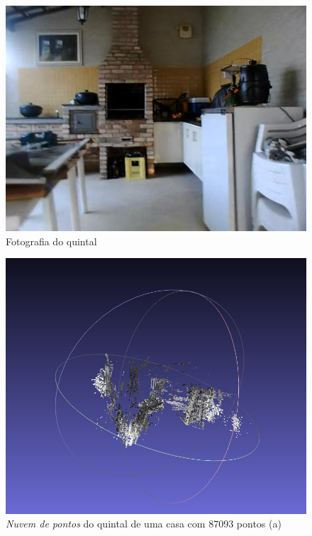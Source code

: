 \begin{figure}[H]
	\centering
		\includegraphics[width= \textwidth]{Imagens/figura4-12.jpg}
	\caption{Fotografia do quintal}
	\label{fig4:12}
\end{figure}

\begin{figure}[H]
	\centering
		\includegraphics[width= \textwidth]{Imagens/figura4-10.jpg}
	\caption{\textit{Nuvem de pontos} do quintal de uma casa com 87093 pontos (a)}
	\label{fig4:10}
\end{figure}

